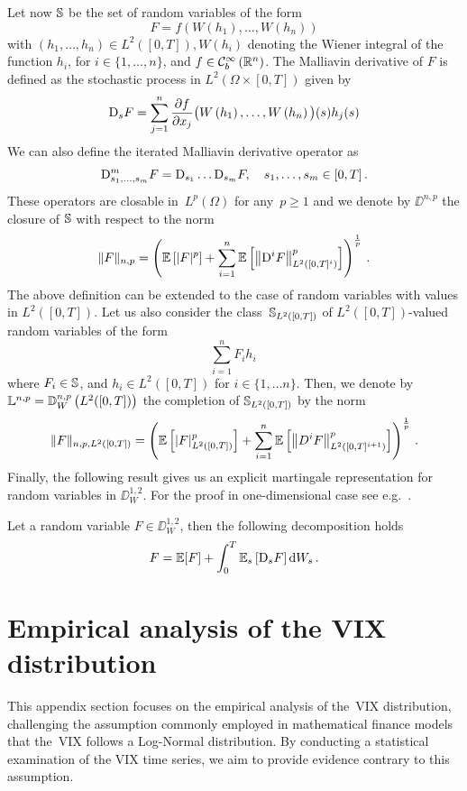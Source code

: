 \begin{spacing}{1.15}
Let now $\mathbb{S}$ be the set of random variables of the form
\[
F=f\left(W\left(h_1\right), \ldots, W\left(h_n\right)\right)
\]
with $(h_1, \ldots, h_n) \in L^2([0, T]), W\left(h_i\right)$ denoting the Wiener integral of the function $h_i$, for $i\in\{1, \dots, n\}$, and $f \in \mathcal{C}_b^{\infty}\left(\mathbb{R}^n\right)$. The Malliavin derivative of $F$ is defined as the stochastic process in $L^2(\Omega \times[0, T])$ given by
\[
\mathrm{D}_s F=\sum_{j=1}^n \frac{\partial f}{\partial x_j}\big(W\left(h_1\right), \ldots, W\left(h_n\right)\big)(s) h_j(s)
\]
We can also define the iterated Malliavin derivative operator as
\[
\mathrm{D}_{s_1, \dots, s_m}^m F = \mathrm{D}_{s_1} \dots \mathrm{D}_{s_m} F, \quad s_1, \dots, s_m \in[0, T]\,.
\]
These operators are closable in~$L^p(\Omega)$ for any~$p \geq 1$ and we denote by $\DD^{n, p}$ the closure of $\mathbb{S}$ with respect to the norm
\[
\|F\|_{n, p}=\left(\mathbb{E}\left[|F|^p\right]+\sum_{i=1}^n \mathbb{E}\left[\left\|\mathrm{D}^i F\right\|_{L^2\left([0, T]^i\right)}^p\right]\right)^{\frac{1}{p}}\,.
\]
The above definition can be extended to the case of random variables with values in $L^2([0, T])$. Let us also consider the class~$\mathbb{S}_{L^2([0, T])}$ of $L^2([0, T])$-valued random variables of the form
\[
\sum_{i=1}^n F_i h_i\,
\]
where $F_i \in \mathbb{S}$, and $h_i \in L^2([0, T])$ for $i\in\{1,\dots n\}$. Then, we denote by~${\mathbb{L}^{n, p}= \mathbb{D}_W^{n, p}\left(L^2([0, T])\right)}$ the completion of $\mathbb{S}_{L^2([0, T])}$ by the norm
\[
\|F\|_{n, p, L^2([0, T])}=\left(\mathbb{E}\left[|F|_{L^2([0, T])}^p\right] + \sum_{i=1}^n \mathbb{E}\left[\left\|D^i F\right\|_{L^2\left([0, T]^{i+1}\right)}^p\right]\right)^{\frac{1}{p}}\,.
\]
Finally, the following result gives us an explicit martingale representation for random variables in $\DD_W^{1,2}$. For the proof in one-dimensional case see e.g.~\cite[Proposition 1.3.14]{Nualart2006TheTopics}.
\begin{theorem}\label{thm:ClarkOcone}
Let a random variable $F \in \DD_W^{1,2}$, then the following decomposition holds
\[
F = \mathbb{E}[F] + \int_0^T \mathbb{E}_s\left[\mathrm{D}_s F\right] \mathrm{d} W_s\,.
\]
\end{theorem}
\end{spacing}

\section{Empirical analysis of the VIX distribution}\label{apx:VIX_smile_rBergomi}

This appendix section focuses on the empirical analysis of the~VIX distribution, challenging the assumption commonly employed in mathematical finance models that the~VIX follows a Log-Normal distribution. By conducting a statistical examination of the VIX time series, we aim to provide evidence contrary to this assumption. 

